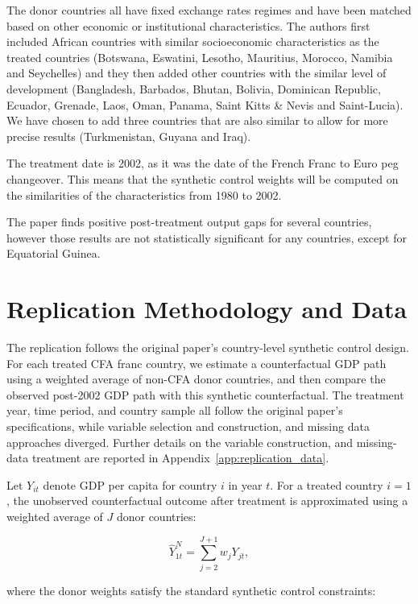 \documentclass[a4paper]{article}
\begin{document}
The donor countries all have fixed exchange rates regimes and have been matched based on other economic or institutional characteristics. The authors first included African countries with similar socioeconomic characteristics as the treated countries (Botswana, Eswatini, Lesotho, Mauritius, Morocco, Namibia and Seychelles) and they then added other countries with the similar level of development (Bangladesh, Barbados, Bhutan, Bolivia, Dominican Republic, Ecuador, Grenade, Laos, Oman, Panama, Saint Kitts \& Nevis and Saint-Lucia). We have chosen to add three countries that are also similar to allow for more precise results (Turkmenistan, Guyana and Iraq). 

The treatment date is 2002, as it was the date of the French Franc to Euro peg changeover. This means that the synthetic control weights will be computed on the similarities of the characteristics from 1980 to 2002. 

The paper finds positive post-treatment output gaps for several countries, however those results are not statistically significant for any countries, except for Equatorial Guinea. 

\section{Replication Methodology and Data}

The replication follows the original paper's country-level synthetic control design. For each treated CFA franc country, we estimate a counterfactual GDP path using a weighted average of non-CFA donor countries, and then compare the observed post-2002 GDP path with this synthetic counterfactual. The treatment year, time period, and country sample all follow the original paper's specifications, while variable selection and construction, and missing data approaches diverged. Further details on the variable construction, and missing-data treatment are reported in Appendix~\ref{app:replication_data}.

Let \(Y_{it}\) denote GDP per capita for country \(i\) in year \(t\). For a treated country \(i=1\), the unobserved counterfactual outcome after treatment is approximated using a weighted average of \(J\) donor countries:

\begin{equation}
\widehat{Y}_{1t}^{N}
=
\sum_{j=2}^{J+1} w_j Y_{jt},
\label{eq:synthetic_outcome}
\end{equation}

where the donor weights satisfy the standard synthetic control constraints:
\end{document}
